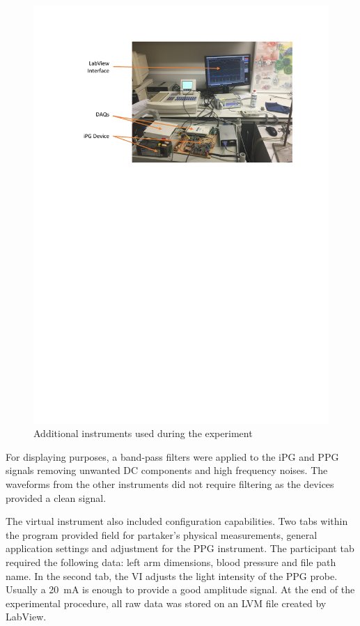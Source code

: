 \begin{figure}[!htpb]
	\centering
	\includegraphics[width=15cm,keepaspectratio]{figure2}
	\caption{Additional instruments used during the experiment}
	\label{fig:experimental set-up 2}
\end{figure}

For displaying purposes, a band-pass filters were applied to the iPG and PPG signals removing unwanted DC components and high frequency noises. The waveforms from the other instruments did not require filtering as the devices provided a clean signal. 

The virtual instrument also included configuration capabilities. Two tabs within the program provided field for partaker's physical measurements, general application settings and adjustment for the PPG instrument. The participant tab required the following data: left arm dimensions, blood pressure and file path name. In the second tab, the VI adjusts the light intensity of the PPG probe. Usually a \SI{20}{\milli\ampere} is enough to provide a good amplitude signal. At the end of the experimental procedure, all raw data was stored on an LVM file created by LabView.

